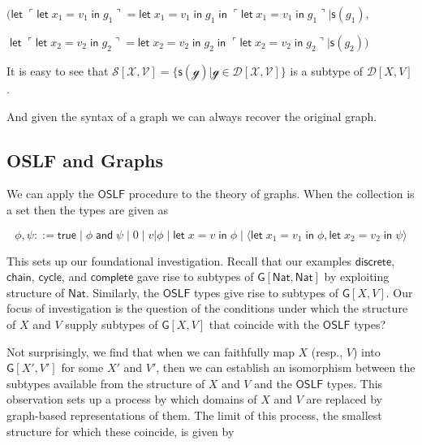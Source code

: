 \documentclass[12pt]{llncs}
\begin{document}
\((\mathsf{let}\; \ulcorner \mathsf{let}\; x_1 = v_1 \;\mathsf{in}\; g_1 \urcorner = \mathsf{let}\; x_1 = v_1 \;\mathsf{in}\; g_1 \; \mathsf{in}\; \ulcorner \mathsf{let}\; x_1 = v_1 \;\mathsf{in}\; g_1 \urcorner | \mathsf{s}(g_1),\)

\(\;\mathsf{let}\; \ulcorner \mathsf{let}\; x_2 = v_2 \;\mathsf{in}\; g_2 \urcorner = \mathsf{let}\; x_2 = v_2 \;\mathsf{in}\; g_2 \; \mathsf{in}\; \ulcorner \mathsf{let}\; x_2 = v_2 \;\mathsf{in}\; g_2 \urcorner | \mathsf{s}(g_2))\)

It is easy to see that
\(\mathcal{S[X,V] = \{ \mathsf{s}(g) | g \in \mathcal{D}[X,V] \}}\) is a
subtype of \(\mathcal{D}[X,V]\).

And given the syntax of a graph we can always recover the original
graph.

\hypertarget{oslf-and-graphs}{%
\subsection{OSLF and Graphs}\label{oslf-and-graphs}}

We can apply the \(\mathsf{OSLF}\) procedure to the theory of graphs.
When the collection is a set then the types are given as

\[\phi, \psi ::= \mathsf{true}\;|\; \phi \;\mathsf{and}\; \psi \; |\; 0 \;|\; v|\phi \;|\; \mathsf{let}\; x = v \; \mathsf{in}\; \phi \;|\; \langle \mathsf{let}\; x_1 = v_1 \; \mathsf{in}\; \phi, \mathsf{let}\; x_2 = v_2 \; \mathsf{in}\; \psi\rangle\]

This sets up our foundational investigation. Recall that our examples
\(\mathsf{discrete}\), \(\mathsf{chain}\), \(\mathsf{cycle}\), and
\(\mathsf{complete}\) gave rise to subtypes of
\(\mathsf{G}[\mathsf{Nat},\mathsf{Nat}]\) by exploiting structure of
\(\mathsf{Nat}\). Similarly, the \(\mathsf{OSLF}\) types give rise to
subtypes of \(\mathsf{G}[X,V]\). Our focus of investigation is the
question of the conditions under which the structure of \(X\) and \(V\)
supply subtypes of \(\mathsf{G}[X,V]\) that coincide with the
\(\mathsf{OSLF}\) types?

Not surprisingly, we find that when we can faithfully map \(X\) (resp.,
\(V\)) into \(\mathsf{G}[X',V']\) for some \(X'\) and \(V'\), then we
can establish an isomorphism between the subtypes available from the
structure of \(X\) and \(V\) and the \(\mathsf{OSLF}\) types. This
observation sets up a process by which domains of \(X\) and \(V\) are
replaced by graph-based representations of them. The limit of this
process, the smallest structure for which these coincide, is given by
\end{document}
